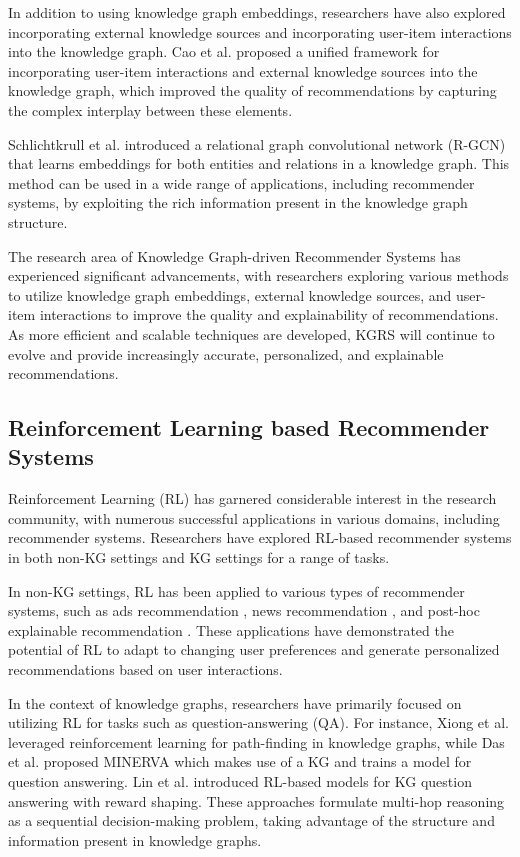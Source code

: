 \documentclass[11pt]{article}
\begin{document}
In addition to using knowledge graph embeddings, researchers have also explored incorporating external knowledge sources and incorporating user-item interactions into the knowledge graph. Cao et al. \cite{cao2019unifying} proposed a unified framework for incorporating user-item interactions and external knowledge sources into the knowledge graph, which improved the quality of recommendations by capturing the complex interplay between these elements.

Schlichtkrull et al. \cite{schlichtkrull2018modeling} introduced a relational graph convolutional network (R-GCN) that learns embeddings for both entities and relations in a knowledge graph. This method can be used in a wide range of applications, including recommender systems, by exploiting the rich information present in the knowledge graph structure.

The research area of Knowledge Graph-driven Recommender Systems has experienced significant advancements, with researchers exploring various methods to utilize knowledge graph embeddings, external knowledge sources, and user-item interactions to improve the quality and explainability of recommendations. As more efficient and scalable techniques are developed, KGRS will continue to evolve and provide increasingly accurate, personalized, and explainable recommendations.

\subsection{Reinforcement Learning based Recommender Systems}
Reinforcement Learning (RL) has garnered considerable interest in the research community, with numerous successful applications in various domains, including recommender systems. Researchers have explored RL-based recommender systems in both non-KG settings and KG settings for a range of tasks.

In non-KG settings, RL has been applied to various types of recommender systems, such as ads recommendation \cite{theocharous2015ad}, news recommendation \cite{zheng2018drn}, and post-hoc explainable recommendation \cite{wang2018reinforcement}. These applications have demonstrated the potential of RL to adapt to changing user preferences and generate personalized recommendations based on user interactions.

In the context of knowledge graphs, researchers have primarily focused on utilizing RL for tasks such as question-answering (QA). For instance, Xiong et al. \cite{xiong2017deeppath} leveraged reinforcement learning for path-finding in knowledge graphs, while Das et al. \cite{das2017go} proposed MINERVA which makes use of a KG and trains a model for question answering. Lin et al. \cite{DBLP:conf/emnlp/LinSX18} introduced RL-based models for KG question answering with reward shaping. These approaches formulate multi-hop reasoning as a sequential decision-making problem, taking advantage of the structure and information present in knowledge graphs.
\end{document}
